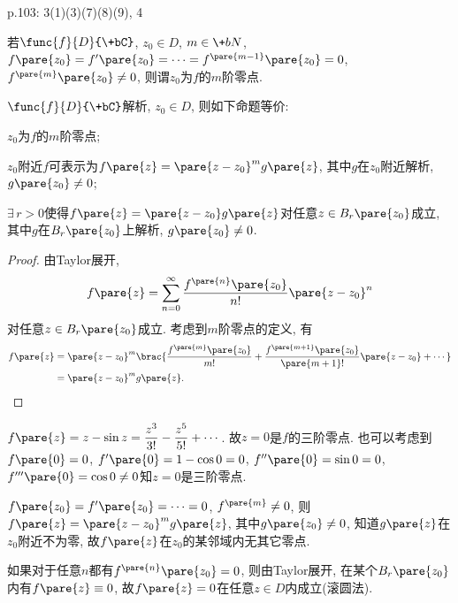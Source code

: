 \documentclass{ctexart}
\begin{document}
p.103: 3(1)(3)(7)(8)(9), 4


\begin{definition}
    若$\func{f}{D}{\+bC}$, $z_0\in D$, $m\in \+bN$, $f\pare{z_0} = f'\pare{z_0} = \cdots = f^{\pare{m-1}}\pare{z_0} = 0$, $f^{\pare{m}}\pare{z_0}\neq 0$, 则谓$z_0$为$f$的$m$阶零点.
\end{definition}
\begin{theorem}
    $\func{f}{D}{\+bC}$解析, $z_0 \in D$, 则如下命题等价:
    \begin{cenum}
        \item $z_0$为$f$的$m$阶零点;
        \item $z_0$附近$f$可表示为$f\pare{z} = \pare{z-z_0}^mg\pare{z}$, 其中$g$在$z_0$附近解析, $g\pare{z_0}\neq 0$;
        \item $\exists\, r>0$使得$f\pare{z} = \pare{z-z_0}g\pare{z}$对任意$z\in B_r\pare{z_0}$成立, 其中$g$在$B_r\pare{z_0}$上解析, $g\pare{z_0}\neq 0$.
    \end{cenum}
\end{theorem}
\begin{proof}
    由Taylor展开,
    \[ f\pare{z} = \sum_{n=0}^\infty \frac{f^{\pare{n}}\pare{z_0}}{n!}\pare{z-z_0}^n \]
    对任意$z\in B_r\pare{z_0}$成立. 考虑到$m$阶零点的定义, 有
    \begin{align*}
        f\pare{z} &= \pare{z-z_0}^m \brac{\frac{f^{\pare{m}}\pare{z_0}}{m!} + \frac{f^{\pare{m+1}}\pare{z_0}}{\pare{m+1}!}\pare{z-z_0} + \cdots}\\ & = \pare{z-z_0}^m g\pare{z}. \qedhere
    \end{align*}
\end{proof}
\begin{sample}
    \begin{ex}
        $f\pare{z} = \displaystyle z-\sin z = \frac{z^3}{3!} - \frac{z^5}{5!} + \cdots$. 故$z=0$是$f$的三阶零点. 也可以考虑到$f\pare{0} = 0$, $f'\pare{0} = 1-\cos 0 = 0$, $f''\pare{0} = \sin 0 = 0$, $f'''\pare{0} = \cos 0 \neq 0$知$z=0$是三阶零点.
    \end{ex}
\end{sample}
\begin{remark}
    $f\pare{z_0} = f'\pare{z_0} = \cdots = 0$, $f^{\pare{m}}\neq 0$, 则$f\pare{z} = \pare{z-z_0}^mg\pare{z}$, 其中$g\pare{z_0}\neq 0$, 知道$g\pare{z}$在$z_0$附近不为零, 故$f\pare{z}$在$z_0$的某邻域内无其它零点.
\end{remark}
\begin{remark}
    \label{rm:一列为零_处处为零}
    如果对于任意$n$都有$f^{\pare{n}}\pare{z_0} = 0$, 则由Taylor展开, 在某个$B_r\pare{z_0}$内有$f\pare{z} \equiv 0$, 故$f\pare{z} = 0$在任意$z\in D$内成立(滚圆法).
\end{remark}
\end{document}
